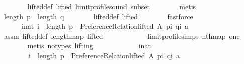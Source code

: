 \begin{isabellebody}
\ \ \ \ \ \ \isamarkupfalse%
\ lifted{\isacharunderscore}{\kern0pt}def\ lifted\ limit{\isacharunderscore}{\kern0pt}profile{\isacharunderscore}{\kern0pt}sound\ subset\isanewline
\ \ \ \ \ \ \isamarkupfalse%
\ metis\isanewline
\ \ \ \ \isamarkupfalse%
\ \isamarkupfalse%
\ {\isachardoublequoteopen}length\ {\isacharquery}{\kern0pt}p\ {\isacharequal}{\kern0pt}\ length\ {\isacharquery}{\kern0pt}q{\isachardoublequoteclose}\isanewline
\ \ \ \ \ \ \isamarkupfalse%
\ lifted{\isacharunderscore}{\kern0pt}def\ lifted\isanewline
\ \ \ \ \ \ \isamarkupfalse%
\ fastforce\isanewline
\ \ \ \ \isamarkupfalse%
\ \isamarkupfalse%
\isanewline
\ \ \ \ \ \ {\isachardoublequoteopen}{\isasymexists}i{\isacharcolon}{\kern0pt}{\isacharcolon}{\kern0pt}nat{\isachardot}{\kern0pt}\ i\ {\isacharless}{\kern0pt}\ length\ {\isacharquery}{\kern0pt}p\ {\isasymand}\ Preference{\isacharunderscore}{\kern0pt}Relation{\isachardot}{\kern0pt}lifted\ A\ {\isacharparenleft}{\kern0pt}{\isacharquery}{\kern0pt}p{\isacharbang}{\kern0pt}i{\isacharparenright}{\kern0pt}\ {\isacharparenleft}{\kern0pt}{\isacharquery}{\kern0pt}q{\isacharbang}{\kern0pt}i{\isacharparenright}{\kern0pt}\ a{\isachardoublequoteclose}\isanewline
\ \ \ \ \ \ \isamarkupfalse%
\ assm\ lifted{\isacharunderscore}{\kern0pt}def\ length{\isacharunderscore}{\kern0pt}map\ lifted\isanewline
\ \ \ \ \ \ \ \ \ \ \ \ limit{\isacharunderscore}{\kern0pt}profile{\isachardot}{\kern0pt}simps\ nth{\isacharunderscore}{\kern0pt}map\ one\isanewline
\ \ \ \ \ \ \isamarkupfalse%
\ {\isacharparenleft}{\kern0pt}metis\ {\isacharparenleft}{\kern0pt}no{\isacharunderscore}{\kern0pt}types{\isacharcomma}{\kern0pt}\ lifting{\isacharparenright}{\kern0pt}{\isacharparenright}{\kern0pt}\isanewline
\ \ \ \ \isamarkupfalse%
\ \isamarkupfalse%
\isanewline
\ \ \ \ \ \ {\isachardoublequoteopen}{\isasymforall}i{\isacharcolon}{\kern0pt}{\isacharcolon}{\kern0pt}nat{\isachardot}{\kern0pt}\isanewline
\ \ \ \ \ \ \ \ {\isacharparenleft}{\kern0pt}i\ {\isacharless}{\kern0pt}\ length\ {\isacharquery}{\kern0pt}p\ {\isasymand}\ {\isasymnot}Preference{\isacharunderscore}{\kern0pt}Relation{\isachardot}{\kern0pt}lifted\ A\ {\isacharparenleft}{\kern0pt}{\isacharquery}{\kern0pt}p{\isacharbang}{\kern0pt}i{\isacharparenright}{\kern0pt}\ {\isacharparenleft}{\kern0pt}{\isacharquery}{\kern0pt}q{\isacharbang}{\kern0pt}i{\isacharparenright}{\kern0pt}\ a{\isacharparenright}{\kern0pt}\ {\isasymlongrightarrow}\isanewline

\end{isabellebody}
